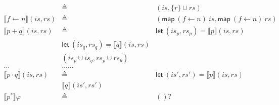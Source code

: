 \documentclass[12pt, letterpaper]{article}
\begin{document}
\begin{align*}
			& \triangleq &
			(\mathit{is}, \{r\} \cup \mathit{rs})
			\\
		\llbracket f \leftarrow n \rrbracket(\mathit{is}, \mathit{rs})
			& \triangleq &
                (\mathsf{map}\ (f\leftarrow n)\ \mathit{is},
                 \mathsf{map}\ (f\leftarrow n)\ \mathit{rs}) \\
		 \llbracket p + q \rrbracket(\mathit{is}, \mathit{rs})
                 &\triangleq &
                 \mathsf{let}\ (\mathit{is}_p,\mathit{rs}_p) =
                 \llbracket p \rrbracket(\mathit{is}, \mathit{rs}) \\
                &\mathsf{let}\ (\mathit{is}_q,\mathit{rs}_q) =
                \llbracket q \rrbracket(\mathit{is}, \mathit{rs}) \\
                &(\mathit{is}_p \cup \mathit{is}_q,\mathit{rs}_p \cup \mathit{rs}_b) \\
		\dots & \dots \dots \\
		\llbracket p \cdot q \rrbracket(\mathit{is}, \mathit{rs})
		&
                \triangleq &
                 \mathsf{let}\ (\mathit{is}',\mathit{rs}') =
                 \llbracket p \rrbracket(\mathit{is}, \mathit{rs}) \\
                 &\llbracket q \rrbracket(\mathit{is}', \mathit{rs}') \\
		\llbracket p ^{*} \rrbracket \varphi
			& \triangleq &
			()?
			\\
	\end{align*}
\end{document}
